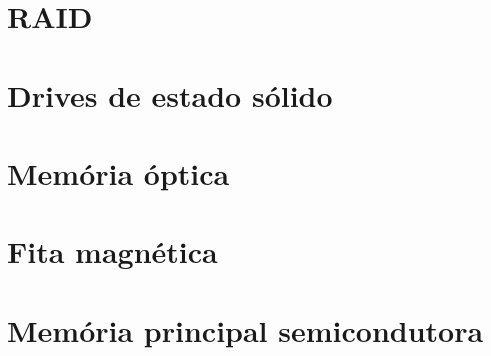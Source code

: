 \section[slide=true]{RAID}
\section[slide=true]{Drives de estado sólido}
\section[slide=true]{Memória óptica}
\section[slide=true]{Fita magnética}
\section[slide=true]{Memória principal semicondutora}

%
%
%
%



